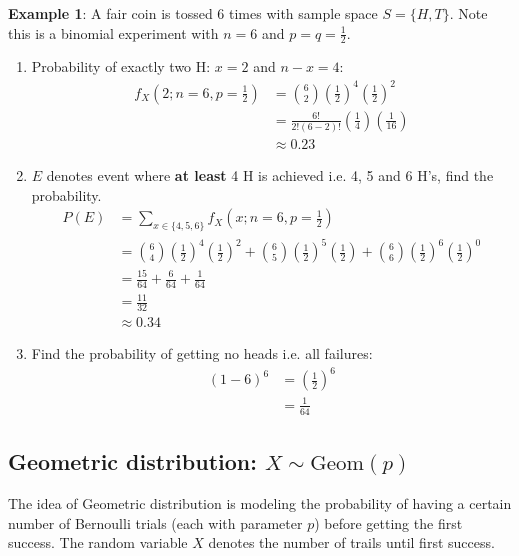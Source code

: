 \documentclass[10pt,a4paper]{article}
\begin{document}
\textbf{Example 1}: A fair coin is tossed $6$ times with sample space $S=\{H,T\}$. Note this is a
binomial experiment with $n=6$ and $p=q=\frac{1}{2}$.
\begin{enumerate}
    \item Probability of exactly two H: $x = 2$ and $n-x = 4$:
    \begin{align*}
        f_X(2;n=6,p=\frac{1}{2})&={6\choose 2} \left(\frac{1}{2}\right)^4 \left(\frac{1}{2}\right)^2 \\
        &= \frac{6!}{2!(6-2)!} \left(\frac{1}{4}\right) \left(\frac{1}{16}\right) \\
        &\approx 0.23
    \end{align*}

    \item $E$ denotes event where \textbf{at least} 4 H is achieved i.e. 4, 5 and 6 H's, find the probability.
    \begin{align*}
        P(E) &= \sum_{x\in\{4,5,6\}} f_X\left(x; n=6, p=\frac{1}{2}\right) \\
        &= {6\choose 4}\left(\frac{1}{2}\right)^4\left(\frac{1}{2}\right)^2 + {6\choose 5}\left(\frac{1}{2}\right)^5\left(\frac{1}{2}\right) + {6\choose 6}\left(\frac{1}{2}\right)^6\left(\frac{1}{2}\right)^0 \\
        &= \frac{15}{64} + \frac{6}{64} + \frac{1}{64}\\
        &= \frac{11}{32} \\
        &\approx 0.34
    \end{align*}

    \item Find the probability of getting no heads i.e. all failures:
    \begin{align*}
        (1-6)^6 &= \left(\frac{1}{2}\right)^6 \\
        &= \frac{1}{64}
    \end{align*}
\end{enumerate}

\subsection{Geometric distribution: $X\sim \text{Geom} (p)$}

The idea of Geometric distribution is modeling the probability of having a certain number of
Bernoulli trials (each with parameter $p$) before getting the first success. The random variable $X$
denotes the number of trails until first success.
\end{document}
